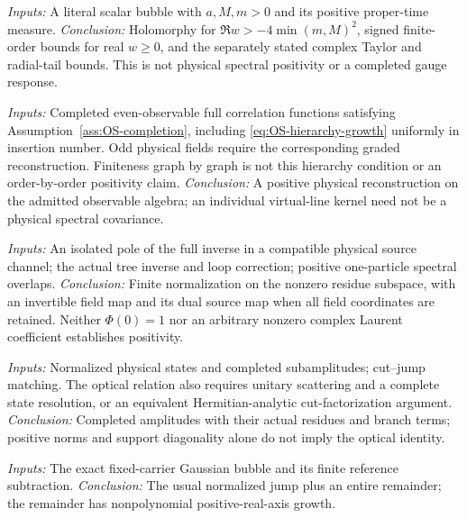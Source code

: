 \documentclass[final,5p,times,twocolumn,numbers,nopreprintline]{elsarticle}
\numberwithin{equation}{section}
\theoremstyle{definition}
\theoremstyle{remark}
\newcommand{\Ph}{\Phi}
\begin{document}
\begin{description}[style=nextline]
\item[Scalar approximation.] \textit{Inputs:} A literal scalar bubble
with \(a,M,m>0\) and its positive proper-time measure. \textit{Conclusion:} Holomorphy for
\(\Re w>-4\min(m,M)^2\), signed finite-order bounds for real
\(w\geq0\), and the separately stated complex Taylor and radial-tail
bounds. This is not physical spectral positivity or a completed gauge
response.

\item[Physical reconstruction.] \textit{Inputs:} Completed even-observable
full correlation functions satisfying Assumption~\ref{ass:OS-completion},
including \eqref{eq:OS-hierarchy-growth} uniformly in insertion
number. Odd physical fields require the corresponding graded
reconstruction. Finiteness graph by graph is not this hierarchy
condition or an order-by-order positivity claim.
\textit{Conclusion:} A positive physical reconstruction on the admitted
observable algebra; an individual virtual-line kernel need not be
a physical spectral covariance.

\item[Pole normalization.] \textit{Inputs:} An isolated pole of the
full inverse in a compatible physical source channel; the actual tree
inverse and loop correction; positive one-particle spectral overlaps.
\textit{Conclusion:} Finite normalization on the nonzero residue
subspace, with an invertible field map and its dual source map when
all field coordinates are retained. Neither \(\Ph(0)=1\) nor an
arbitrary nonzero complex Laurent coefficient establishes positivity.

\item[Cut matching and optical relation.] \textit{Inputs:} Normalized physical states and completed subamplitudes; cut--jump
matching. The optical relation also requires unitary scattering
and a complete state resolution, or an equivalent Hermitian-analytic
cut-factorization argument.
\textit{Conclusion:} Completed amplitudes with their actual residues and branch terms;
positive norms and support diagonality alone do not imply the
optical identity.

\item[Gaussian shell normalization.] \textit{Inputs:} The exact fixed-carrier Gaussian bubble and its finite reference
subtraction.
\textit{Conclusion:} The usual normalized jump plus an entire remainder; the remainder
has nonpolynomial positive-real-axis growth.


\end{description}
\end{document}

